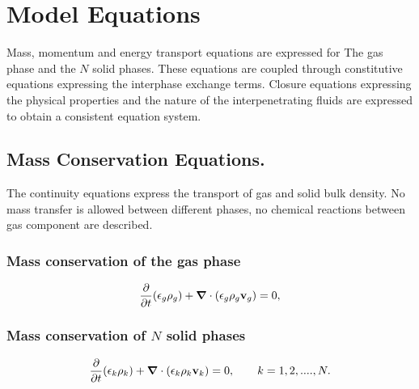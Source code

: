 \section{Model Equations}

Mass, momentum and energy transport equations are expressed for
The gas phase and the $N$ solid phases. 
These equations are coupled through constitutive equations expressing
the interphase exchange terms. Closure equations expressing the
physical properties and the nature of the interpenetrating fluids are 
expressed to obtain a consistent equation system.

\subsection{Mass Conservation Equations.}
The continuity equations express the transport of gas and solid bulk
density. No mass transfer is allowed between different phases, no
chemical reactions between gas component are described. 

\subsubsection{\hspace{1cm} Mass conservation of the gas phase}

\begin{equation}
\frac{\partial}{\partial t}(\epsilon_{g}\rho_{g})+
\mbox{\boldmath $\nabla$}\cdot (\epsilon_{g}\rho_{g}{\bf v}_{g})=0,
\label{eq:gas_mass}
\end{equation}


\subsubsection{\hspace{1cm}Mass conservation of $N$ solid phases}

\begin{equation}
\frac{\partial}{\partial t}(\epsilon_{k}\rho_{k})+
\mbox{\boldmath $\nabla$}\cdot (\epsilon_{k}\rho_{k}{\bf v}_{k})=0,
\qquad k=1,2, ....,N.
\label{eq:solid_mass}
\end{equation}


